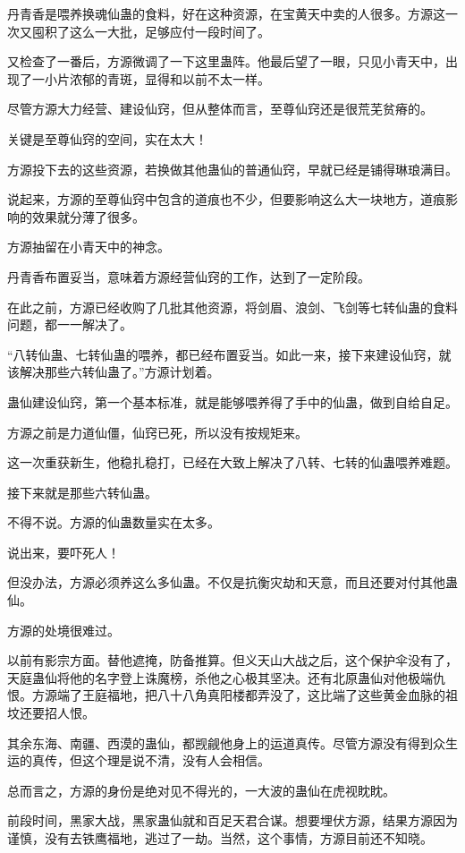 \begin{this_body}
丹青香是喂养换魂仙蛊的食料，好在这种资源，在宝黄天中卖的人很多。方源这一次又囤积了这么一大批，足够应付一段时间了。

又检查了一番后，方源微调了一下这里蛊阵。他最后望了一眼，只见小青天中，出现了一小片浓郁的青斑，显得和以前不太一样。

尽管方源大力经营、建设仙窍，但从整体而言，至尊仙窍还是很荒芜贫瘠的。

关键是至尊仙窍的空间，实在太大！

方源投下去的这些资源，若换做其他蛊仙的普通仙窍，早就已经是铺得琳琅满目。

说起来，方源的至尊仙窍中包含的道痕也不少，但要影响这么大一块地方，道痕影响的效果就分薄了很多。

方源抽留在小青天中的神念。

丹青香布置妥当，意味着方源经营仙窍的工作，达到了一定阶段。

在此之前，方源已经收购了几批其他资源，将剑眉、浪剑、飞剑等七转仙蛊的食料问题，都一一解决了。

“八转仙蛊、七转仙蛊的喂养，都已经布置妥当。如此一来，接下来建设仙窍，就该解决那些六转仙蛊了。”方源计划着。

蛊仙建设仙窍，第一个基本标准，就是能够喂养得了手中的仙蛊，做到自给自足。

方源之前是力道仙僵，仙窍已死，所以没有按规矩来。

这一次重获新生，他稳扎稳打，已经在大致上解决了八转、七转的仙蛊喂养难题。

接下来就是那些六转仙蛊。

不得不说。方源的仙蛊数量实在太多。

说出来，要吓死人！

但没办法，方源必须养这么多仙蛊。不仅是抗衡灾劫和天意，而且还要对付其他蛊仙。

方源的处境很难过。

以前有影宗方面。替他遮掩，防备推算。但义天山大战之后，这个保护伞没有了，天庭蛊仙将他的名字登上诛魔榜，杀他之心极其坚决。还有北原蛊仙对他极端仇恨。方源端了王庭福地，把八十八角真阳楼都弄没了，这比端了这些黄金血脉的祖坟还要招人恨。

其余东海、南疆、西漠的蛊仙，都觊觎他身上的运道真传。尽管方源没有得到众生运的真传，但这个理是说不清，没有人会相信。

总而言之，方源的身份是绝对见不得光的，一大波的蛊仙在虎视眈眈。

前段时间，黑家大战，黑家蛊仙就和百足天君合谋。想要埋伏方源，结果方源因为谨慎，没有去铁鹰福地，逃过了一劫。当然，这个事情，方源目前还不知晓。


\end{this_body}
